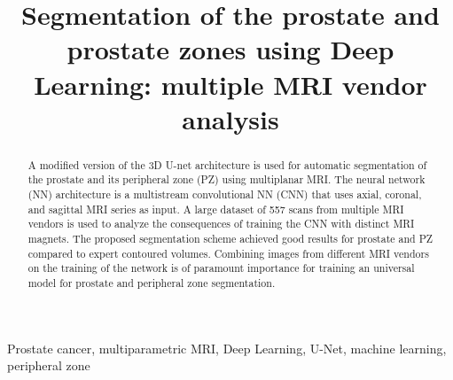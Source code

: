 \documentclass{article}
\title{ Segmentation of the prostate and prostate zones using Deep Learning: multiple MRI vendor analysis }
\begin{document}
\maketitle

\begin{abstract}
A modified version of the 3D U-net architecture is used
for automatic segmentation of the prostate and its peripheral zone (PZ) using
multiplanar MRI. The neural network (NN) architecture is a multistream convolutional
NN (CNN) that uses axial, coronal, and sagittal MRI series as input. 
A large dataset of 557 scans from multiple MRI vendors is used to analyze
the consequences of training the CNN with distinct MRI magnets. 
The proposed segmentation scheme achieved good results for prostate and 
PZ compared to expert contoured volumes. Combining images from different MRI 
vendors on the training of the network is of paramount importance for training an universal model for
prostate and peripheral zone segmentation. 
\end{abstract}

\begin{keywords}
Prostate cancer, multiparametric MRI, Deep Learning, U-Net, 
machine learning, peripheral zone
\end{keywords}








\end{document}
